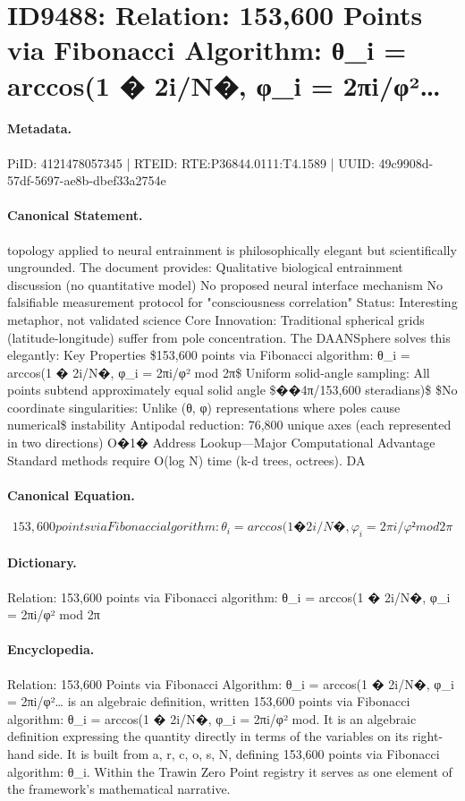 \section*{ID9488: Relation: 153,600 Points via Fibonacci Algorithm: θ\_i = arccos(1 � 2i/N�, φ\_i = 2πi/φ²…}
\paragraph{Metadata.}
PiID: 4121478057345 | RTEID: RTE:P36844.0111:T4.1589 | UUID: 49c9908d-57df-5697-ae8b-dbef33a2754e

\paragraph{Canonical Statement.}
topology applied to neural entrainment is philosophically elegant but scientifically ungrounded. The document provides: Qualitative biological entrainment discussion (no quantitative model) No proposed neural interface mechanism No falsifiable measurement protocol for "consciousness correlation" Status: Interesting metaphor, not validated science Core Innovation: Traditional spherical grids (latitude-longitude) suffer from pole concentration. The DAANSphere solves this elegantly: Key Properties \$153,600 points via Fibonacci algorithm: θ\_i = arccos(1 � 2i/N�, φ\_i = 2πi/φ² mod 2π\$ Uniform solid-angle sampling: All points subtend approximately equal solid angle \$��4π/153,600 steradians)\$ \$No coordinate singularities: Unlike (θ, φ) representations where poles cause numerical\$ instability Antipodal reduction: 76,800 unique axes (each represented in two directions) O�1� Address Lookup—Major Computational Advantage Standard methods require O(log N) time (k-d trees, octrees). DA

\paragraph{Canonical Equation.}
\[
153,600 points via Fibonacci algorithm: θ_i = arccos(1 � 2i/N�, φ_i = 2πi/φ² mod 2π
\]

\paragraph{Dictionary.}
Relation: 153,600 points via Fibonacci algorithm: θ\_i = arccos(1 � 2i/N�, φ\_i = 2πi/φ² mod 2π

\paragraph{Encyclopedia.}
Relation: 153,600 Points via Fibonacci Algorithm: θ\_i = arccos(1 � 2i/N�, φ\_i = 2πi/φ²… is an algebraic definition, written 153,600 points via Fibonacci algorithm: θ\_i = arccos(1 � 2i/N�, φ\_i = 2πi/φ² mod. It is an algebraic definition expressing the quantity directly in terms of the variables on its right-hand side. It is built from a, r, c, o, s, N, defining 153,600 points via Fibonacci algorithm: θ\_i. Within the Trawin Zero Point registry it serves as one element of the framework's mathematical narrative.
